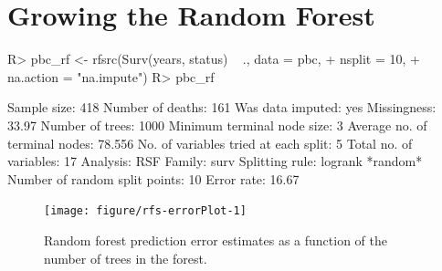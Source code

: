 \documentclass[nojss]{jss}\usepackage[]{graphicx}\usepackage[]{color}
\begin{document}
\section{Growing the Random Forest}

\begin{Schunk}
\begin{Sinput}
R> pbc_rf <- rfsrc(Surv(years, status) ~ ., data = pbc, 
+                 nsplit = 10, 
+                 na.action = "na.impute")
R> pbc_rf
\end{Sinput}
\end{Schunk}

\begin{Schunk}
\begin{Soutput}
                         Sample size: 418
                    Number of deaths: 161
                    Was data imputed: yes
                         Missingness: 33.97%
                     Number of trees: 1000
          Minimum terminal node size: 3
       Average no. of terminal nodes: 78.556
No. of variables tried at each split: 5
              Total no. of variables: 17
                            Analysis: RSF
                              Family: surv
                      Splitting rule: logrank *random*
       Number of random split points: 10
                          Error rate: 16.67%
\end{Soutput}
\end{Schunk}

\begin{Schunk}
\begin{figure}[!htpb]

{\centering \texttt{[image: figure/rfs-errorPlot-1]} 

}

\caption[Random forest prediction error estimates as a function of the number of trees in the forest]{Random forest prediction error estimates as a function of the number of trees in the forest.\label{fig:errorPlot}}
\end{figure}
\end{Schunk}
\end{document}
